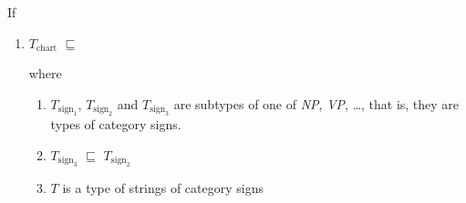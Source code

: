 \begin{ex} 
If
\begin{enumerate} 
 
\item $T_{\mathrm{chart}}$ $\sqsubseteq$ 

where

\begin{enumerate} 
 
\item [] $T_{\mathrm{sign}_1}$, $T_{\mathrm{sign}_2}$ and
  $T_{\mathrm{sign}_3}$ are subtypes of one of \textit{NP},
  \textit{VP}, \ldots, that is, they are types of category signs.

\item [] $T_{\mathrm{sign}_3}$ $\sqsubseteq$ $T_{\mathrm{sign}_2}$
 
\item [] $T$ is a type of strings of category signs
 

\end{enumerate}
\end{enumerate}
\end{ex}
